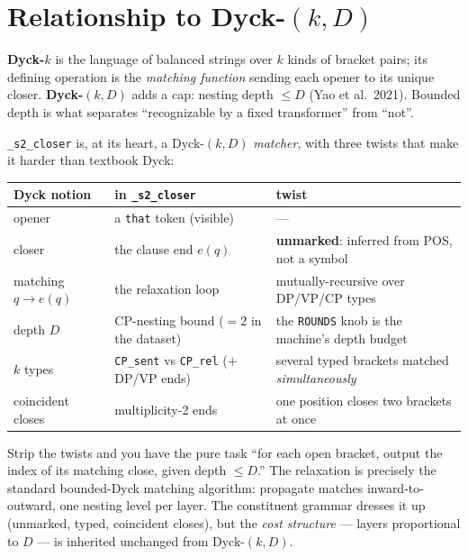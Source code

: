 \documentclass[11pt]{article}
\newcommand{\code}[1]{\texttt{#1}}
\begin{document}
\section{Relationship to Dyck-$(k,D)$}

\begin{rulebox}
\textbf{Dyck-$k$} is the language of balanced strings over $k$ kinds of bracket pairs; its defining
operation is the \emph{matching function} sending each opener to its unique closer. \textbf{Dyck-$(k,D)$}
adds a cap: nesting depth $\le D$ (Yao et al.\ 2021). Bounded depth is what separates
``recognizable by a fixed transformer'' from ``not''.
\end{rulebox}

\noindent \texttt{\_s2\_closer} is, at its heart, a Dyck-$(k,D)$ \emph{matcher}, with three twists
that make it harder than textbook Dyck:

\begin{center}\footnotesize
\begin{tabular}{@{}lll@{}}
\toprule
Dyck notion & in \texttt{\_s2\_closer} & twist\\
\midrule
opener      & a \code{that} token (visible)                    & --- \\
closer      & the clause end $e(q)$                            & \textbf{unmarked}: inferred from POS, not a symbol\\
matching $q\!\to\!e(q)$ & the relaxation loop               & mutually-recursive over DP/VP/CP types\\
depth $D$   & CP-nesting bound ($=2$ in the dataset)           & the \code{ROUNDS} knob is the machine's depth budget\\
$k$ types   & \code{CP\_sent} vs \code{CP\_rel} ($+$ DP/VP ends) & several typed brackets matched \emph{simultaneously}\\
coincident closes & multiplicity-2 ends                        & one position closes two brackets at once\\
\bottomrule
\end{tabular}
\end{center}

\noindent Strip the twists and you have the pure task ``for each open bracket, output the index of
its matching close, given depth $\le D$.'' The relaxation is precisely the standard bounded-Dyck
matching algorithm: propagate matches inward-to-outward, one nesting level per layer. The
constituent grammar dresses it up (unmarked, typed, coincident closes), but the \emph{cost
structure} --- layers proportional to $D$ --- is inherited unchanged from Dyck-$(k,D)$.
\end{document}
